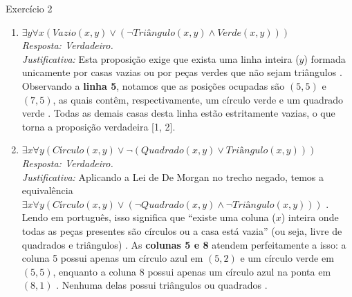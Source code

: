 \documentclass[a4paper,11pt]{article}
\theoremstyle{definition}
\theoremstyle{plain}
\theoremstyle{remark}
\newcounter{questao}[section]
\begin{document}
\begin{questaoManually}{Exercício 2}
\begin{enumerate}
\item \textbf{$\exists y \forall x (Vazio(x, y) \lor (\neg Triângulo(x, y) \land Verde(x, y)))$} \\
\textit{Resposta: Verdadeiro.} \\
\textit{Justificativa:} Esta proposição exige que exista uma linha inteira ($y$) formada unicamente por casas vazias ou por peças verdes que não sejam triângulos . Observando a \textbf{linha 5}, notamos que as posições ocupadas são $(5, 5)$ e $(7, 5)$, as quais contêm, respectivamente, um círculo verde e um quadrado verde . Todas as demais casas desta linha estão estritamente vazias, o que torna a proposição verdadeira [1, 2].

\item \textbf{$\exists x \forall y (Círculo(x, y) \lor \neg(Quadrado(x, y) \lor Triângulo(x, y)))$} \\
\textit{Resposta: Verdadeiro.} \\
\textit{Justificativa:} Aplicando a Lei de De Morgan no trecho negado, temos a equivalência $\exists x \forall y (Círculo(x, y) \lor (\neg Quadrado(x, y) \land \neg Triângulo(x, y)))$ . Lendo em português, isso significa que ``existe uma coluna ($x$) inteira onde todas as peças presentes são círculos ou a casa está vazia'' (ou seja, livre de quadrados e triângulos) . As \textbf{colunas 5 e 8} atendem perfeitamente a isso: a coluna 5 possui apenas um círculo azul em $(5, 2)$ e um círculo verde em $(5, 5)$, enquanto a coluna 8 possui apenas um círculo azul na ponta em $(8, 1)$ . Nenhuma delas possui triângulos ou quadrados .
\end{enumerate}

\end{questaoManually}
\end{document}
